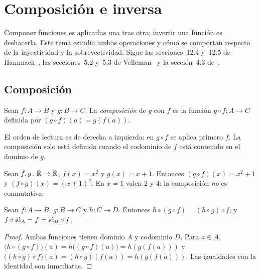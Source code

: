 \chapter{Composición e inversa}
\label{tema:4}

Componer funciones es aplicarlas una tras otra; invertir una función es deshacerla. Este tema estudia ambas operaciones y cómo se comportan respecto de la inyectividad y la sobreyectividad. Sigue las secciones~12.4 y~12.5 de Hammack~\cite{hammack}, las secciones~5.2 y~5.3 de Velleman~\cite{velleman} y la sección~4.3 de~\cite{mcs}.

\section{Composición}

\begin{definicion}[Composición]
Sean $f\colon A\to B$ y $g\colon B\to C$. La \emph{composición} de $g$ con $f$ es la función $g\circ f\colon A\to C$ definida por $(g\circ f)(a)=g(f(a))$.
\end{definicion}

El orden de lectura es de derecha a izquierda: en $g\circ f$ se aplica primero $f$. La composición solo está definida cuando el codominio de $f$ está contenido en el dominio de $g$.

\begin{ejemplo}\label{ej:t4-comp}
Sean $f,g\colon\mathbb{R}\to\mathbb{R}$, $f(x)=x^{2}$ y $g(x)=x+1$. Entonces $(g\circ f)(x)=x^{2}+1$ y $(f\circ g)(x)=(x+1)^{2}$. En $x=1$ valen $2$ y $4$: la composición \emph{no} es conmutativa.
\end{ejemplo}

\begin{proposicion}\label{prop:t4-asoc}
Sean $f\colon A\to B$, $g\colon B\to C$ y $h\colon C\to D$. Entonces $h\circ(g\circ f)=(h\circ g)\circ f$, y $f\circ\mathrm{id}_A=f=\mathrm{id}_B\circ f$.
\end{proposicion}

\begin{proof}
Ambas funciones tienen dominio $A$ y codominio $D$. Para $a\in A$, $\bigl(h\circ(g\circ f)\bigr)(a)=h\bigl((g\circ f)(a)\bigr)=h(g(f(a)))$ y $\bigl((h\circ g)\circ f\bigr)(a)=(h\circ g)(f(a))=h(g(f(a)))$. Las igualdades con la identidad son inmediatas.
\end{proof}

